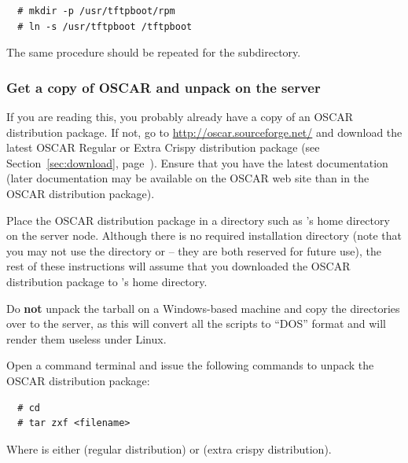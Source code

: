 \begin{verbatim}
  # mkdir -p /usr/tftpboot/rpm
  # ln -s /usr/tftpboot /tftpboot
\end{verbatim}

The same procedure should be repeated for the
 subdirectory.

    
\subsubsection{Get a copy of OSCAR and unpack on the server} 
\label{det:unpack}

If you are reading this, you probably already have a copy of an OSCAR
distribution package.  If not, go to
\url{http://oscar.sourceforge.net/} and download the latest OSCAR
Regular or Extra Crispy distribution package (see
Section~\ref{sec:download}, page~\pageref{sec:download}).  Ensure that
you have the latest documentation (later documentation may be
available on the OSCAR web site than in the OSCAR distribution
package).

Place the OSCAR distribution package in a directory such as
's home directory on the server node.  Although there is no
required installation directory (note that you may not use the
directory  or  -- they are
both reserved for future use), the rest of these instructions will
assume that you downloaded the OSCAR distribution package to
's home directory.

Do {\bf not} unpack the tarball on a Windows-based machine and copy
the directories over to the server, as this will convert all the
scripts to ``DOS'' format and will render them useless under Linux.

Open a command terminal and issue the following commands to unpack the
OSCAR distribution package:

\begin{verbatim}
  # cd
  # tar zxf <filename>
\end{verbatim}

Where  is either
 (regular distribution) or
 (extra crispy
distribution).

\def\obase{$^\sim$/oscar-\oscarversion}


